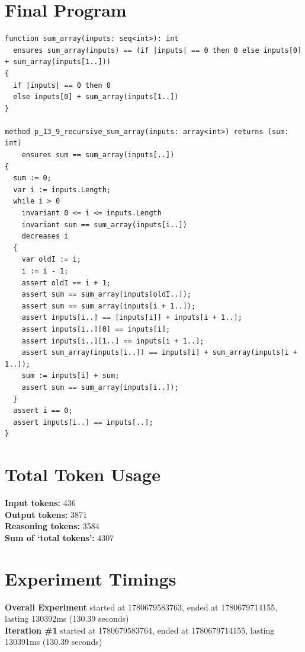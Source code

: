 \documentclass{article}
\begin{document}
\section*{Final Program}
\begin{lstlisting}
function sum_array(inputs: seq<int>): int
  ensures sum_array(inputs) == (if |inputs| == 0 then 0 else inputs[0] + sum_array(inputs[1..]))
{
  if |inputs| == 0 then 0
  else inputs[0] + sum_array(inputs[1..])
}

method p_13_9_recursive_sum_array(inputs: array<int>) returns (sum: int)
	ensures sum == sum_array(inputs[..])
{
  sum := 0;
  var i := inputs.Length;
  while i > 0
    invariant 0 <= i <= inputs.Length
    invariant sum == sum_array(inputs[i..])
    decreases i
  {
    var oldI := i;
    i := i - 1;
    assert oldI == i + 1;
    assert sum == sum_array(inputs[oldI..]);
    assert sum == sum_array(inputs[i + 1..]);
    assert inputs[i..] == [inputs[i]] + inputs[i + 1..];
    assert inputs[i..][0] == inputs[i];
    assert inputs[i..][1..] == inputs[i + 1..];
    assert sum_array(inputs[i..]) == inputs[i] + sum_array(inputs[i + 1..]);
    sum := inputs[i] + sum;
    assert sum == sum_array(inputs[i..]);
  }
  assert i == 0;
  assert inputs[i..] == inputs[..];
}
\end{lstlisting}
\section*{Total Token Usage}
\textbf{Input tokens: }436
\\\textbf{Output tokens: }3871
\\\textbf{Reasoning tokens: }3584
\\\textbf{Sum of `total tokens': }4307
\section*{Experiment Timings}
\textbf{Overall Experiment} started at 1780679583763, ended at 1780679714155, lasting 130392ms (130.39 seconds)
\\\textbf{Iteration \#1} started at 1780679583764, ended at 1780679714155, lasting 130391ms (130.39 seconds)
\end{document}

